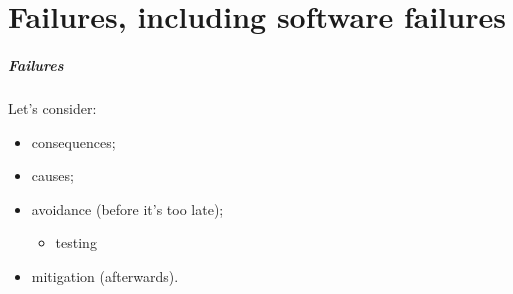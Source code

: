 \documentclass{beamer}
\newenvironment{changemargin}[1]{%
  \begin{list}{}{%
    \setlength{\topsep}{0pt}%
    \setlength{\leftmargin}{#1}%
    \setlength{\rightmargin}{1em}
    \setlength{\listparindent}{\parindent}%
    \setlength{\itemindent}{\parindent}%
    \setlength{\parsep}{\parskip}%
  }%
  \item[]}{\end{list}}
\begin{document}
\part{Failures, including software failures}
\begin{frame}
  \partpage
\end{frame}

\begin{frame}
  \frametitle{Failures}

\Large
\begin{changemargin}{2em}
  Let's consider:

\begin{itemize}
\item consequences;
\item causes; \\[0.2em]
\item avoidance (before it's too late); 
\begin{itemize}
\item \Large testing
\end{itemize}
\item mitigation (afterwards).
\end{itemize}
\end{changemargin}
\end{frame}
\end{document}
